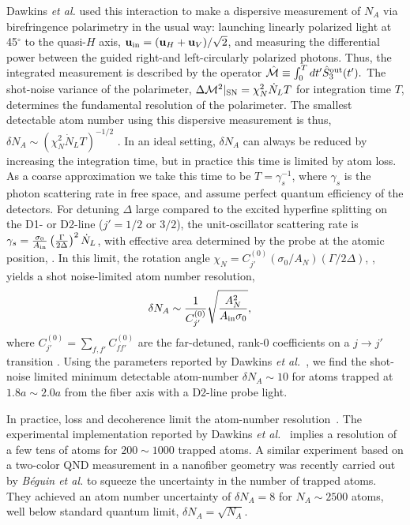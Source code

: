 \documentclass[preprint, aps,pra,onecolumn]{revtex4-1} %
\newcommand{\inp}{{\rm in}}
\newcommand{\shotnoise}{\Delta \mathcal{M}^2 |_{\rm SN}}
\newcommand{\chiN}{\chi_{N}}
\newcommand{\Abir}{A_N}
\begin{document}
Dawkins {\em et al.} \cite{dawkins_dispersive_2011} used this interaction to make a dispersive measurement of $N_A$ via birefringence polarimetry in the usual way: launching linearly polarized light at 45$^\circ$ to the quasi-$H$ axis, $\mbf{u}_\inp = (\mbf{u}_H + \mbf{u}_V )/\sqrt{2}$, and measuring the differential power between the guided right-and left-circularly polarized photons. 
Thus, the integrated measurement is described by the operator $\hat{\mathcal{M}} \equiv \int_0^T dt' \hat{S}^{\rm out}_3(t').$  The shot-noise variance of the polarimeter, $\shotnoise =  \chiN^2 \dot{N}_L T$ for integration time $T$,  determines the fundamental resolution of the polarimeter.  
The smallest detectable atom number using this dispersive measurement is thus, $\delta N_A \sim ( \chiN^2 \dot{N}_L T)^{-1/2}$ \cite{smith_faraday_2003}.  
In an ideal setting, $\delta N_A$ can always be reduced by increasing the integration time, but in practice this time is limited by atom loss. As a coarse approximation we take this time to be $T=\gamma_s^{-1}$, where $\gamma_s$ is the photon scattering rate in free space, and assume perfect quantum efficiency of the detectors.  
For detuning $\Delta$ large compared to the excited hyperfine splitting on the D1- or D2-line ($j' = 1/2$ or $3/2$), the unit-oscillator scattering rate is 
$\gamma_s =\frac{\sigma_0}{A_{\rm in}}\left(\frac{\Gamma}{2 \Delta}\right)^2 \dot{N}_L $, 
with effective area determined by the probe at the atomic position, .  
In this limit, the rotation angle $\chiN = C^{(0)}_{j'} (\sigma_0/\Abir)(\Gamma/2\Delta)$, , yields a shot noise-limited atom number resolution, 
	\begin{align} \label{Eq::AtomNumberResolution}
		\delta N_A  &\sim \frac{1}{C^{(0)}_{j'}}\sqrt {\frac{\Abir^2}{A_{\rm in} \sigma_0}},
	\end{align}
where $ C^{(0)}_{j'}=\sum_{f,f'}C^{(0)}_{ff'}$ are the far-detuned, rank-$0$ coefficients on a $j \rightarrow j'$ transition \cite{deutsch_quantum_2010}.  
Using the parameters reported by Dawkins \emph{et al.}~\cite{dawkins_dispersive_2011}, we find the shot-noise limited minimum detectable atom-number $\delta N_A \sim 10$ for atoms trapped at $ 1.8a\sim 2.0a $ from the fiber axis with a D2-line probe light. 

In practice, loss and decoherence limit the atom-number resolution~\cite{dawkins_dispersive_2011, zhang_collective_2012}. 
The experimental implementation reported by Dawkins \emph{et al.}~\cite{dawkins_dispersive_2011} implies a resolution of a few tens of atoms for $ 200\sim 1000 $ trapped atoms.  
A similar experiment based on a two-color QND measurement in a nanofiber geometry was recently carried out by \emph{B\'{e}guin et al.} \cite{beguin_generation_2014} to squeeze the uncertainty in the number of trapped atoms. They achieved an atom number uncertainty of $\delta N_A = 8$ for $N_A\sim2500$ atoms, well below standard quantum limit, $\delta N_A=\sqrt{N_A}$.
\end{document}
